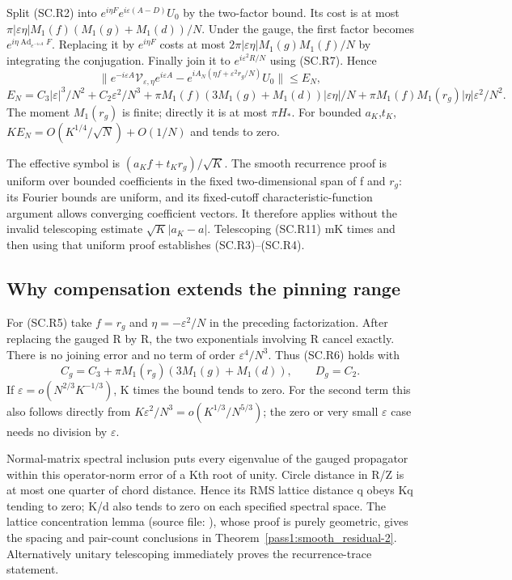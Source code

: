 Split (SC.R2) into \(e^{i\eta F}e^{i\varepsilon(A-D)}U_0\) by the two-factor bound. Its cost is at most \(\pi|\varepsilon\eta|M_1(f)(M_1(g)+M_1(d))/N\). Under the gauge, the first factor becomes \(e^{i\eta\operatorname{Ad}_{e^{-i\varepsilon A}}F}\). Replacing it by \(e^{i\eta F}\) costs at most \(2\pi|\varepsilon\eta|M_1(g)M_1(f)/N\) by integrating the conjugation. Finally join it to \(e^{i\varepsilon^2R/N}\) using (SC.R7). Hence \[
 \|e^{-i\varepsilon A}\mathcal V_{\varepsilon,\eta}e^{i\varepsilon A}
                -e^{iA_N(\eta f+\varepsilon^2 r_g/N)}U_0\|
 \leq E_N,                                                    \tag{SC.R11}
\] \[
 E_N=C_3|\varepsilon|^3/N^2+C_2\varepsilon^2/N^3
   +\pi M_1(f)(3M_1(g)+M_1(d))|\varepsilon\eta|/N
   +\pi M_1(f)M_1(r_g)|\eta|\varepsilon^2/N^2.
\] The moment \(M_1(r_g)\) is finite; directly it is at most \(\pi H_*\). For bounded \(a_{K}\),\(t_{K}\), \(KE_N=O(K^{1/4}/\sqrt N)+O(1/N)\) and tends to zero.

The effective symbol is \((a_K f+t_K r_g)/\sqrt K\). The smooth recurrence proof is uniform over bounded coefficients in the fixed two-dimensional span of f and \(r_{g}\): its Fourier bounds are uniform, and its fixed-cutoff characteristic-function argument allows converging coefficient vectors. It therefore applies without the invalid telescoping estimate \(\sqrt K|a_K-a|\). Telescoping (SC.R11) mK times and then using that uniform proof establishes (SC.R3)--(SC.R4).

\subsection{Why compensation extends the pinning range}\label{smooth_residual:why-compensation-extends-the-pinning-range}

For (SC.R5) take \(f=r_g\) and \(\eta=-\varepsilon^2/N\) in the preceding factorization. After replacing the gauged R by R, the two exponentials involving R cancel exactly. There is no joining error and no term of order \(\varepsilon^4/N^3\). Thus (SC.R6) holds with \[
 C_g=C_3+\pi M_1(r_g)(3M_1(g)+M_1(d)),\qquad D_g=C_2.
\] If \(\varepsilon=o(N^{2/3}K^{-1/3})\), K times the bound tends to zero. For the second term this also follows directly from \(K\varepsilon^2/N^3=o(K^{1/3}/N^{5/3})\); the zero or very small \(\varepsilon\) case needs no division by \(\varepsilon\).

Normal-matrix spectral inclusion puts every eigenvalue of the gauged propagator within this operator-norm error of a Kth root of unity. Circle distance in R/Z is at most one quarter of chord distance. Hence its RMS lattice distance q obeys Kq tending to zero; K/d also tends to zero on each specified spectral space. The lattice concentration lemma (source file: ), whose proof is purely geometric, gives the spacing and pair-count conclusions in Theorem~\ref{pass1:smooth_residual-2}. Alternatively unitary telescoping immediately proves the recurrence-trace statement.

